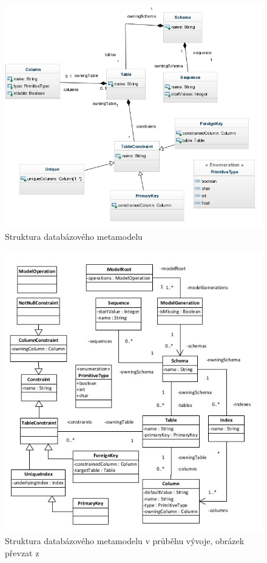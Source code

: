 \documentclass[11pt,twoside,a4paper]{book}
\begin{document}
\begin{figure}[H]
\begin{center}
\includegraphics[width=15cm]{figures/rdb_structure}
\caption{Struktura databázového metamodelu}
\label{fig:rdb_str}
\end{center}
\end{figure}
%
\begin{figure}[H]
\begin{center}
\includegraphics[width=15cm]{figures/rdb_structure_tarant}
\caption{Struktura databázového metamodelu v průběhu vývoje, obrázek převzat z
\cite{Tarant_bp}}
\label{fig:rdb_str_tarant}
\end{center}
\end{figure}
\end{document}
